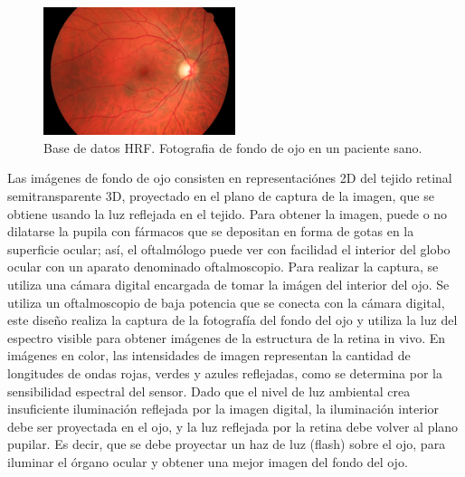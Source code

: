 \begin{figure}[H]
	{
	\centering
	\includegraphics[width=0.5\textwidth]{Figures/01_h}
	\caption[Fotografia de fondo de ojo]{Base de datos HRF. Fotografia de fondo de ojo en un paciente sano.}
	\label{fig:FotoFondoOjo}
	}
\end{figure}

Las im\'agenes de fondo de ojo consisten en representaci\'ones 2D del tejido retinal semitransparente 3D, proyectado en el plano de captura de la imagen, que se obtiene usando la luz reflejada en el tejido.
Para obtener la imagen, puede o no dilatarse la pupila con f\'armacos que se depositan en forma de gotas en la superficie ocular; as\'i, el oftalm\'ologo puede ver con facilidad el interior del globo ocular con un aparato denominado oftalmoscopio. 
Para realizar la captura, se utiliza una c\'amara digital encargada de tomar la im\'agen del interior del ojo. Se utiliza un oftalmoscopio de baja potencia que se conecta con la c\'amara digital, este diseño realiza la captura de la fotograf\'ia del fondo del ojo y utiliza la luz del espectro visible para obtener im\'agenes de la estructura de la retina in vivo. En im\'agenes en color, las intensidades de imagen representan la cantidad de longitudes de ondas rojas, verdes y azules reflejadas, como se determina por la sensibilidad espectral del sensor. Dado que el nivel de luz ambiental crea insuficiente iluminaci\'on reflejada por la imagen digital, la iluminaci\'on interior debe ser proyectada en el ojo, y la luz reflejada por la retina debe volver al plano pupilar. Es decir, que se debe proyectar un haz de luz (flash) sobre el ojo, para iluminar el \'organo ocular y obtener una mejor imagen del fondo del ojo. \cite{kanagasingam2014progress}
